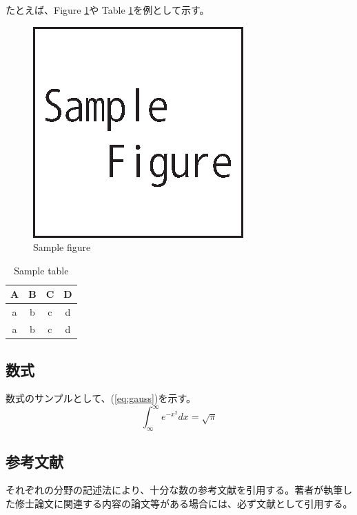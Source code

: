 ﻿\documentclass[11pt,twocolumn]{jarticle} %
\begin{document}
たとえば、Figure \ref{fig:samplefigure}や Table \ref{tbl:sampletable}を例として示す。

\begin{figure}[t]
 \begin{center}
  \includegraphics{sample.eps}
  \caption{Sample figure}\label{fig:samplefigure}
 \end{center}
\end{figure}

\begin{table}
 \caption{Sample table} \label{tbl:sampletable}
\begin{center}
  \begin{tabular}{c|ccc}
  A & B & C & D\\
  \hline \hline
  a & b & c & d\\
  a & b & c & d\\ \hline
 \end{tabular}
\end{center}
\end{table}

\subsection{数式}
数式のサンプルとして、(\ref{eq:gauss})を示す。
\begin{equation}
 \int _\infty ^\infty e^{-x^2}dx = \sqrt{\pi} \label{eq:gauss}
\end{equation}

\subsection{参考文献}
それぞれの分野の記述法により、十分な数の参考文献を引用する\cite{osamu}。著者が執筆した修士論文に関連する内容の論文等がある場合には、必ず文献として引用する。
\end{document}

